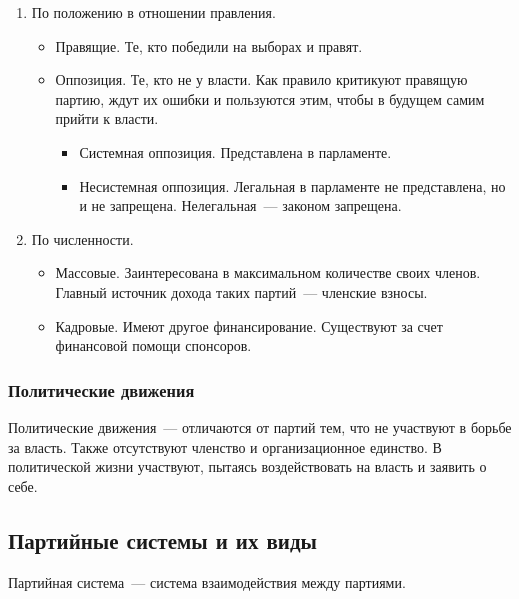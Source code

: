 \documentclass[12pt]{article}
\begin{document}
\begin{enumerate}
\begin{itemize}
			\item Не демократические. Не намерены вести диалоги, стремление подчинить себе другие партии, институты, государство.
		\end{itemize}
		\item По положению в отношении правления.
		\begin{itemize}
			\item Правящие. Те, кто победили на выборах и правят.
			\item Оппозиция. Те, кто не у власти. Как правило критикуют правящую партию, ждут их ошибки и пользуются этим, чтобы в будущем самим прийти к власти.
			\begin{itemize}
				\item Системная оппозиция. Представлена в парламенте.
				\item Несистемная оппозиция. Легальная в парламенте не представлена, но и не запрещена. Нелегальная~--- законом запрещена.
			\end{itemize}
		\end{itemize}
		\item По численности.
		\begin{itemize}
			\item Массовые. Заинтересована в максимальном количестве своих членов. Главный источник дохода таких партий~--- членские взносы.
			\item Кадровые. Имеют другое финансирование. Существуют за счет финансовой помощи спонсоров.
		\end{itemize}
	\end{enumerate}
	\subsubsection{Политические движения}
	\begin{definition}
		Политические движения~--- отличаются от партий тем, что не участвуют в борьбе за власть. Также отсутствуют членство и организационное единство. В политической жизни участвуют, пытаясь воздействовать на власть и заявить о себе.
	\end{definition}
	\subsection{Партийные системы и их виды}
	\begin{definition}
		Партийная система~--- система взаимодействия между партиями.
	\end{definition}
\end{document}
